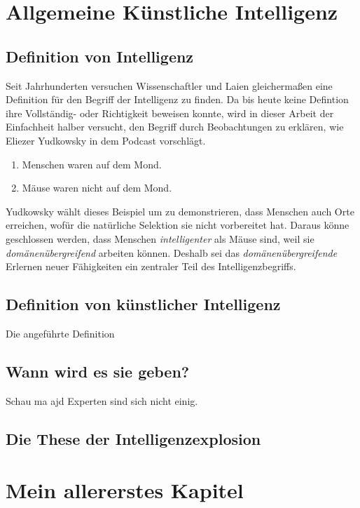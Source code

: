 \chapter{Allgemeine Künstliche Intelligenz}
\section{Definition von Intelligenz}
Seit Jahrhunderten versuchen Wissenschaftler und Laien gleichermaßen eine Definition für den Begriff der Intelligenz zu finden. Da bis heute keine Defintion ihre Vollständig- oder Richtigkeit beweisen konnte, wird in dieser Arbeit der Einfachheit halber versucht, den Begriff durch Beobachtungen zu erklären, wie Eliezer Yudkowsky in dem Podcast  vorschlägt.
\begin{enumerate}
\item Menschen waren auf dem Mond.
\item Mäuse waren nicht auf dem Mond.
\end{enumerate}
Yudkowsky wählt dieses Beispiel um zu demonstrieren, dass Menschen auch Orte erreichen, wofür die natürliche Selektion sie nicht vorbereitet hat. Daraus könne geschlossen werden, dass Menschen \emph{intelligenter} als Mäuse sind, weil sie \emph{domänenübergreifend} arbeiten können. Deshalb sei das \emph{domänenübergreifende} Erlernen neuer Fähigkeiten ein zentraler Teil des Intelligenzbegriffs. 
\section{Definition von künstlicher Intelligenz}

Die angeführte Definition
\section{Wann wird es sie geben?}
Schau ma ajd Experten sind sich nicht einig. 
\section{Die These der Intelligenzexplosion}



\chapter{Mein allererstes Kapitel}
